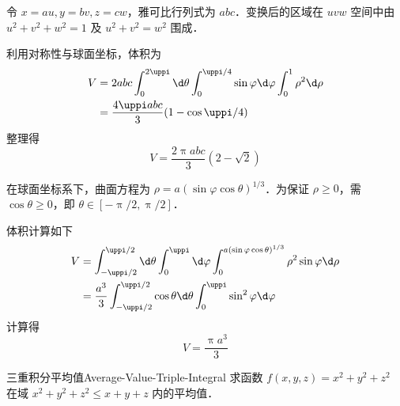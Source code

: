 \begin{solution}
     令 $x = au, y = bv, z = cw$，雅可比行列式为 $abc$．变换后的区域在 $uvw$ 空间中由 $u^2+v^2+w^2=1$ 及 $u^2+v^2=w^2$ 围成．

    利用对称性与球面坐标，体积为
    \begin{equation}
        \begin{aligned}
            V & = 2 abc \int_0^{2\uppi} \d \theta \int_0^{\uppi/4} \sin \varphi \d \varphi \int_0^1 \rho^2 \d \rho \\
              & = \frac{4\uppi abc}{3} (1 - \cos \uppi/4)
        \end{aligned}
    \end{equation}
    整理得
    \begin{equation}
        V = \boxed{\frac{2\uppi abc}{3} (2 - \sqrt{2})}
    \end{equation}

     在球面坐标系下，曲面方程为 $\rho = a (\sin \varphi \cos \theta)^{1/3}$．为保证 $\rho \ge 0$，需 $\cos \theta \ge 0$，即 $\theta \in [-\uppi/2, \uppi/2]$．

    体积计算如下
    \begin{equation}
        \begin{aligned}
            V & = \int_{-\uppi/2}^{\uppi/2} \d \theta \int_0^{\uppi} \d \varphi \int_0^{a(\sin \varphi \cos \theta)^{1/3}} \rho^2 \sin \varphi \d \rho \\
              & = \frac{a^3}{3} \int_{-\uppi/2}^{\uppi/2} \cos \theta \d \theta \int_0^{\uppi} \sin^2 \varphi \d \varphi
        \end{aligned}
    \end{equation}
    计算得
    \begin{equation}
        V = \boxed{\frac{\uppi a^3}{3}}
    \end{equation}
\end{solution}

\begin{problem}{三重积分平均值}{Average-Value-Triple-Integral}
    求函数 $f(x, y, z) = x^2 + y^2 + z^2$ 在域 $x^2 + y^2 + z^2 \leqslant x + y + z$ 内的平均值．
\end{problem}

